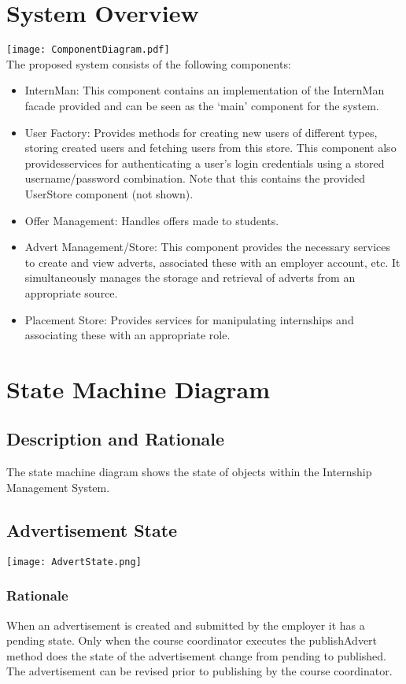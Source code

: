 \documentclass{l3deliverable}
\begin{document}
\section{System Overview}
\texttt{[image: ComponentDiagram.pdf]}\\
The proposed system consists of the following components:
\begin{itemize}
\item{InternMan: This component contains an implementation of the InternMan facade provided and can be seen as the `main' component for the system. }
\item{User Factory: Provides methods for creating new users of different types, storing created users and fetching users from this store. This component also providesservices for authenticating a user's login credentials using a stored username/password combination. Note that this contains the provided UserStore component (not shown).}
\item{Offer Management: Handles offers made to students.}
\item{Advert Management/Store: This component provides the necessary services to create and view adverts, associated these with an employer account, etc. It simultaneously
manages the storage and retrieval of adverts from an appropriate source.}
\item{Placement Store: Provides services for manipulating internships and associating these with an appropriate role.}
\end{itemize}



\section{State Machine Diagram}
\subsection{Description and Rationale}
The state machine diagram shows the state of objects within the Internship Management System.\\

\subsection{Advertisement State}
\texttt{[image: AdvertState.png]}\\

\subsubsection{Rationale}
When an advertisement is created and submitted by the employer it has a pending state.
Only when the course coordinator executes the publishAdvert method does the state of the 
advertisement change from pending to published. The advertisement can be revised prior to
publishing by the course coordinator. \\
\end{document}
